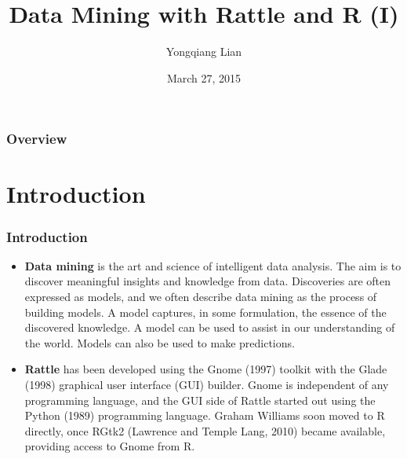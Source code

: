 \documentclass{beamer}\usepackage[]{graphicx}\usepackage[]{color}
\begin{document}
\title[Rattle]{Data Mining with Rattle and R (I)} %

\author{Yongqiang Lian} %
\date{March 27, 2015}

\begin{frame}
\titlepage %
\thispagestyle{empty}
\addtocounter{framenumber}{-1}
\end{frame}

\begin{frame}
\frametitle{Overview} %
\tableofcontents %
\end{frame}

\section{Introduction}

\begin{frame}
\frametitle{Introduction}
\begin{itemize}
\item \textbf{Data mining} is the art and science of intelligent data analysis. The aim is to discover meaningful insights and knowledge from data. Discoveries are often expressed as models, and we often describe data mining as the process of building models. A model captures, in some formulation, the essence of the discovered knowledge. A model can be used to assist in our understanding of the world. Models can also be used to make predictions.
\item \textbf{Rattle} has been developed using the Gnome (1997) toolkit with the Glade (1998) graphical user interface (GUI) builder. Gnome is independent of any programming language, and the GUI side of Rattle started out using the Python (1989) programming language. Graham Williams soon moved to R directly, once RGtk2 (Lawrence and Temple Lang, 2010) became available, providing access to Gnome from R.
\end{itemize}
\end{frame}
\end{document}
